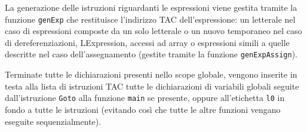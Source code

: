 La generazione delle istruzioni riguardanti le espressioni viene gestita tramite la funzione {\tt genExp} che restituisce l'indirizzo TAC dell'espressione: un letterale nel caso di espressioni composte da un solo letterale o un nuovo temporaneo nel caso di dereferenziazioni, LExpression, accessi ad array o espressioni simili a quelle descritte nel caso dell'assegnamento (gestite tramite la funzione {\tt genExpAssign}).


Terminate tutte le dichiarazioni presenti nello scope globale, vengono inserite in testa alla lista di istruzioni TAC tutte le dichiarazioni di variabili globali seguite dall'istruzione {\tt Goto} alla funzione {\tt main} se presente, oppure all'etichetta {\tt l0} in fondo a tutte le istruzioni (evitando così che tutte le altre funzioni vengano eseguite sequenzialmente).